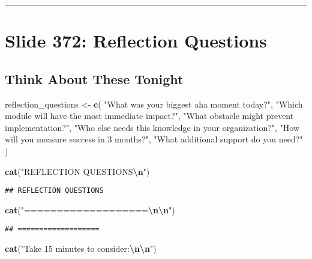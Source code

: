 \documentclass[
]{article}
\newenvironment{Shaded}{\begin{snugshade}}{\end{snugshade}}
\newcommand{\FunctionTok}[1]{\textcolor[rgb]{0.13,0.29,0.53}{\textbf{#1}}}
\newcommand{\NormalTok}[1]{#1}
\newcommand{\OtherTok}[1]{\textcolor[rgb]{0.56,0.35,0.01}{#1}}
\newcommand{\SpecialCharTok}[1]{\textcolor[rgb]{0.81,0.36,0.00}{\textbf{#1}}}
\newcommand{\StringTok}[1]{\textcolor[rgb]{0.31,0.60,0.02}{#1}}
\begin{document}
\begin{center}\rule{0.5\linewidth}{0.5pt}\end{center}

\section{Slide 372: Reflection
Questions}\label{slide-372-reflection-questions}

\subsection{Think About These Tonight}\label{think-about-these-tonight}

\begin{Shaded}
\begin{Highlighting}[]
\NormalTok{reflection\_questions }\OtherTok{\textless{}{-}} \FunctionTok{c}\NormalTok{(}
  \StringTok{"What was your biggest \textquotesingle{}aha\textquotesingle{} moment today?"}\NormalTok{,}
  \StringTok{"Which module will have the most immediate impact?"}\NormalTok{,}
  \StringTok{"What obstacle might prevent implementation?"}\NormalTok{,}
  \StringTok{"Who else needs this knowledge in your organization?"}\NormalTok{,}
  \StringTok{"How will you measure success in 3 months?"}\NormalTok{,}
  \StringTok{"What additional support do you need?"}
\NormalTok{)}

\FunctionTok{cat}\NormalTok{(}\StringTok{"REFLECTION QUESTIONS}\SpecialCharTok{\textbackslash{}n}\StringTok{"}\NormalTok{)}
\end{Highlighting}
\end{Shaded}

\begin{verbatim}
## REFLECTION QUESTIONS
\end{verbatim}

\begin{Shaded}
\begin{Highlighting}[]
\FunctionTok{cat}\NormalTok{(}\StringTok{"===================}\SpecialCharTok{\textbackslash{}n\textbackslash{}n}\StringTok{"}\NormalTok{)}
\end{Highlighting}
\end{Shaded}

\begin{verbatim}
## ===================
\end{verbatim}

\begin{Shaded}
\begin{Highlighting}[]
\FunctionTok{cat}\NormalTok{(}\StringTok{"Take 15 minutes to consider:}\SpecialCharTok{\textbackslash{}n\textbackslash{}n}\StringTok{"}\NormalTok{)}
\end{Highlighting}
\end{Shaded}
\end{document}
